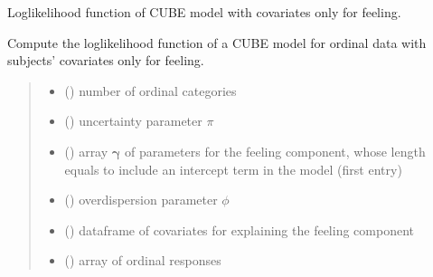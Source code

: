 \documentclass[letterpaper,10pt,english]{sphinxmanual}
\begin{document}
\begin{fulllineitems}
\label{\detokenize{cubmods:cubmods.cube_0w0.loglik}}
\pysigstartsignatures
{}
\pysigstopsignatures
\sphinxAtStartPar
Log\sphinxhyphen{}likelihood function of CUBE model with covariates only for feeling.

\sphinxAtStartPar
Compute the log\sphinxhyphen{}likelihood function of a CUBE model for ordinal data with subjects’ 
covariates only for feeling.
\begin{quote}\begin{description}
\begin{itemize}
\item {} 
\sphinxAtStartPar
{} () \textendash{} number of ordinal categories

\item {} 
\sphinxAtStartPar
{} () \textendash{} uncertainty parameter \(\pi\)

\item {} 
\sphinxAtStartPar
{} () \textendash{} array \(\pmb \gamma\) of parameters for the feeling component, whose length equals 
 to include an intercept term in the model (first entry)

\item {} 
\sphinxAtStartPar
{} () \textendash{} overdispersion parameter \(\phi\)

\item {} 
\sphinxAtStartPar
{} () \textendash{} dataframe of covariates for explaining the feeling component

\item {} 
\sphinxAtStartPar
{} () \textendash{} array of ordinal responses


\end{itemize}
\end{description}
\end{quote}
\end{fulllineitems}
\end{document}
